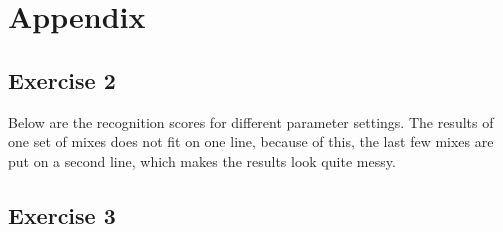 \section*{Appendix}

\subsection{Exercise 2}
Below are the recognition scores for different parameter settings. The results of one set of mixes does not fit on one line, because of this, the last few mixes are put on a second line, which makes the results look quite messy. 
















\subsection{Exercise 3}


